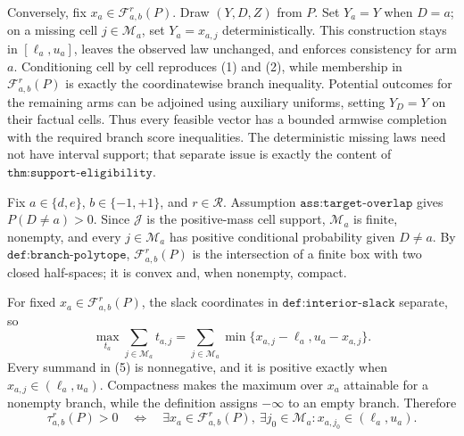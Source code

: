 Conversely, fix \(x_a\in\mathcal F_{a,b}^r(P)\).  Draw \((Y,D,Z)\) from \(P\).  Set \(Y_a=Y\) when \(D=a\); on a missing cell \(j\in\mathcal M_a\), set \(Y_a=x_{a,j}\) deterministically.  This construction stays in \([\ell_a,u_a]\), leaves the observed law unchanged, and enforces consistency for arm \(a\).  Conditioning cell by cell reproduces (1) and (2), while membership in \(\mathcal F_{a,b}^r(P)\) is exactly the coordinatewise branch inequality.  Potential outcomes for the remaining arms can be adjoined using auxiliary uniforms, setting \(Y_D=Y\) on their factual cells.  Thus every feasible vector has a bounded armwise completion with the required branch score inequalities.  The deterministic missing laws need not have interval support; that separate issue is exactly the content of \(\texttt{thm:support-eligibility}\).

Fix \(a\in\{d,e\}\), \(b\in\{-1,+1\}\), and \(r\in\mathcal R\).  Assumption \(\texttt{ass:target-overlap}\) gives \(P(D\ne a)>0\).  Since \(\mathcal J\) is the positive-mass cell support, \(\mathcal M_a\) is finite, nonempty, and every \(j\in\mathcal M_a\) has positive conditional probability given \(D\ne a\).  By \(\texttt{def:branch-polytope}\), \(\mathcal F_{a,b}^r(P)\) is the intersection of a finite box with two closed half-spaces; it is convex and, when nonempty, compact.

For fixed \(x_a\in\mathcal F_{a,b}^r(P)\), the slack coordinates in \(\texttt{def:interior-slack}\) separate, so
\[
 \max_{t_a}\sum_{j\in\mathcal M_a}t_{a,j}
 =\sum_{j\in\mathcal M_a}
   \min\{x_{a,j}-\ell_a,u_a-x_{a,j}\}.                                      \tag{5}
\]
Every summand in (5) is nonnegative, and it is positive exactly when \(x_{a,j}\in(\ell_a,u_a)\).  Compactness makes the maximum over \(x_a\) attainable for a nonempty branch, while the definition assigns \(-\infty\) to an empty branch.  Therefore
\[
 \tau_{a,b}^r(P)>0
 \quad\Longleftrightarrow\quad
 \exists x_a\in\mathcal F_{a,b}^r(P),\ \exists j_0\in\mathcal M_a:
 x_{a,j_0}\in(\ell_a,u_a).                                                    \tag{6}
\]

